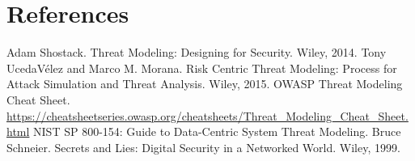 \section*{References}
\begin{thebibliography}{99}
 Adam Shostack. Threat Modeling: Designing for Security. Wiley, 2014.
 Tony UcedaVélez and Marco M. Morana. Risk Centric Threat Modeling: Process for Attack Simulation and Threat Analysis. Wiley, 2015.
 OWASP Threat Modeling Cheat Sheet. \url{https://cheatsheetseries.owasp.org/cheatsheets/Threat_Modeling_Cheat_Sheet.html}
 NIST SP 800-154: Guide to Data-Centric System Threat Modeling.
 Bruce Schneier. Secrets and Lies: Digital Security in a Networked World. Wiley, 1999.
\end{thebibliography}
